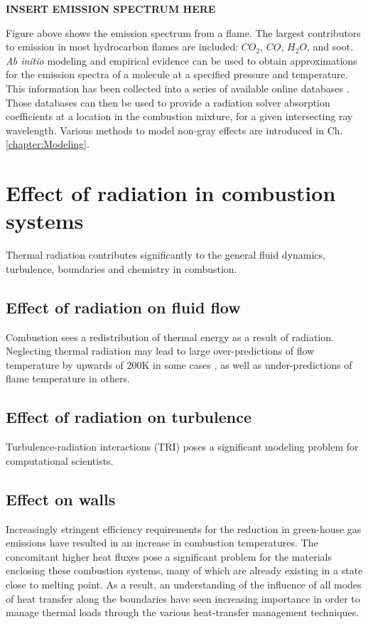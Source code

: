 \textbf{INSERT EMISSION SPECTRUM HERE}

Figure above shows the emission spectrum from a flame. The largest contributors to emission in most hydrocarbon flames are included: $CO_2$, $CO$, $H_2O$, and soot.
\textit{Ab initio} modeling and empirical evidence can be used to obtain approximations for the emission spectra of a molecule at a specified pressure and temperature. This information has been collected into a series of available online databases \cite{Rothman2010HITEMPDatabase}. Those databases can then be used to provide a radiation solver absorption coefficients at a location in the combustion mixture, for a given intersecting ray wavelength. Various methods to model non-gray effects are introduced in Ch. \ref{chapter:Modeling}.

\section{Effect of radiation in combustion systems}
Thermal radiation contributes significantly to the general fluid dynamics, turbulence, boundaries and chemistry in combustion.

\subsection{Effect of radiation on fluid flow}
Combustion sees a redistribution of thermal energy as a result of radiation. 
Neglecting thermal radiation may lead to large over-predictions of flow temperature by upwards of 200K in some cases \cite{Modest2016RadiativeSystems,Wu2021LimitationsFires,Coelho2018RadiativeSystems}, as well as under-predictions of flame temperature in others.

\subsection{Effect of radiation on turbulence}
Turbulence-radiation interactions (TRI) poses a significant modeling problem for computational scientists. 

\subsection{Effect on walls}
Increasingly stringent efficiency requirements for the reduction in green-house gas emissions have resulted in an increase in combustion temperatures. 
The concomitant higher heat fluxes pose a significant problem for the materials enclosing these combustion systems, many of which are already existing in a state close to melting point. 
As a result, an understanding of the influence of all modes of heat transfer along the boundaries have seen increasing importance in order to manage thermal loads through the various heat-transfer management techniques.

